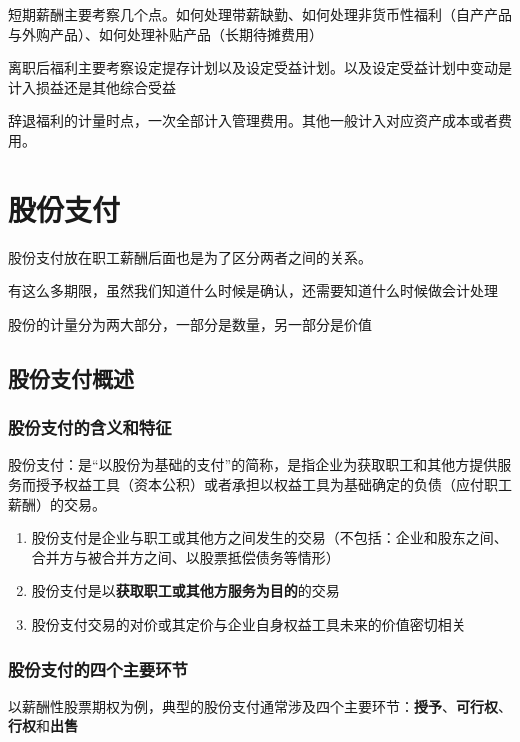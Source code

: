 \documentclass[UTF8,12pt]{ctexart}
\numberwithin{equation}{section} %
\numberwithin{figure}{section}
\numberwithin{table}{section}
\begin{document}
	短期薪酬主要考察几个点。如何处理带薪缺勤、如何处理非货币性福利（自产产品与外购产品）、如何处理补贴产品（长期待摊费用）
	
	离职后福利主要考察设定提存计划以及设定受益计划。以及设定受益计划中变动是计入损益还是其他综合受益
	
	辞退福利的计量时点，一次全部计入管理费用。其他一般计入对应资产成本或者费用。
	
	
	
	
	\newpage
	\section{股份支付}
	股份支付放在职工薪酬后面也是为了区分两者之间的关系。
	
	有这么多期限，虽然我们知道什么时候是确认，还需要知道什么时候做会计处理
	
	股份的计量分为两大部分，一部分是数量，另一部分是价值
	\subsection{股份支付概述}
	
	\subsubsection{股份支付的含义和特征}
	股份支付：是“以股份为基础的支付”的简称，是指企业为获取职工和其他方提供服务而授予权益工具（资本公积）或者承担以权益工具为基础确定的负债（应付职工薪酬）的交易。
	
	\begin{enumerate}
		\item 股份支付是企业与职工或其他方之间发生的交易（不包括：企业和股东之间、合并方与被合并方之间、以股票抵偿债务等情形）
		
		\item 股份支付是以\textbf{获取职工或其他方服务为目的}的交易
		
		\item 股份支付交易的对价或其定价与企业自身权益工具未来的价值密切相关
	\end{enumerate}
	
	\subsubsection{股份支付的四个主要环节}
	以薪酬性股票期权为例，典型的股份支付通常涉及四个主要环节：\textbf{授予}、\textbf{可行权}、\textbf{行权}和\textbf{出售}
	
\end{document}
